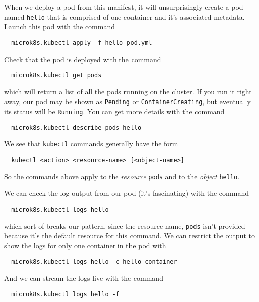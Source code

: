 \documentclass{article}
\begin{document}
When we deploy a pod from this manifest, it will unsurprisingly create a pod named \texttt{hello} that is comprised of one container and it's associated metadata.  Launch this pod with the command

\begin{verbatim}
  microk8s.kubectl apply -f hello-pod.yml
\end{verbatim}  

Check that the pod is deployed with the command

\begin{verbatim}
  microk8s.kubectl get pods
\end{verbatim} 

which will return a list of all the pods running on the cluster. If you run it right away, our pod may be shown as \texttt{Pending} or \texttt{ContainerCreating}, but eventually its status will be \texttt{Running}. You can get more details with the command

\begin{verbatim}
  microk8s.kubectl describe pods hello
\end{verbatim} 

We see that \texttt{kubectl} commands generally have the form

\begin{verbatim}
  kubectl <action> <resource-name> [<object-name>]
\end{verbatim}

So the commands above apply to the \emph{resource} \texttt{pods} and to the \emph{object} \texttt{hello}.

We can check the log output from our pod (it's fascinating) with the command

\begin{verbatim}
  microk8s.kubectl logs hello
\end{verbatim} 

which sort of breaks our pattern, since the resource name, \texttt{pods} isn't provided because it's the default resource for this command. We can restrict the output to show the logs for only one container in the pod with 

\begin{verbatim}
  microk8s.kubectl logs hello -c hello-container
\end{verbatim} 
    
And we can stream the logs live with the command 

\begin{verbatim}
  microk8s.kubectl logs hello -f
\end{verbatim} 
\end{document}
